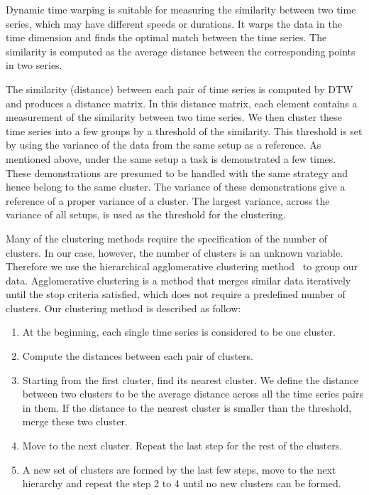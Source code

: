Dynamic time warping is suitable for measuring the similarity between
two time series, which may have different speeds or durations. It
warps the data in the time dimension and finds the optimal match
between the time series. The similarity is computed as the average
distance between the corresponding points in two series.

The similarity (distance) between each pair of time series is computed
by DTW and produces a distance matrix. In this distance matrix, each
element contains a measurement of the similarity between two time
series. We then cluster these time series into a few groups by a
threshold of the similarity. This threshold is set by using the
variance of the data from the same setup as a reference. As mentioned
above, under the same setup a task is demonstrated a few times. These
demonstrations are presumed to be handled with the same strategy and
hence belong to the same cluster. The variance of these demonstrations
give a reference of a proper variance of a cluster. The largest
variance, across the variance of all setups, is used as the threshold
for the clustering.

Many of the clustering methods require the specification of the number of clusters. In our case, however, the number of clusters is an unknown variable. Therefore we use the hierarchical agglomerative clustering method~\citep{willett1988recent} to group our data. Agglomerative clustering is a method that merges similar data iteratively until the stop criteria satisfied, which does not require a predefined number of clusters. Our clustering method is described as follow:

\begin{enumerate}
\item At the beginning, each single time series is considered to be one cluster.
\item Compute the distances between each pair of clusters.
\item Starting from the first cluster, find its nearest cluster. We define the distance between two clusters to be the average distance across all the time series pairs in them. If the distance to the nearest cluster is smaller than the threshold, merge these two cluster.
\item Move to the next cluster. Repeat the last step for the rest of the clusters.
\item A new set of clusters are formed by the last few steps, move to the next hierarchy and repeat the step 2 to 4 until no new clusters can be formed.
\end{enumerate}

